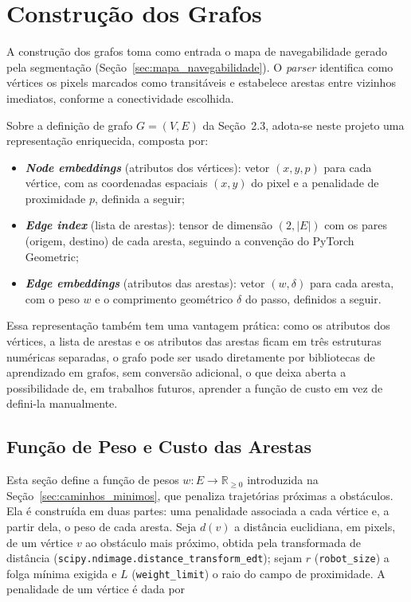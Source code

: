 \documentclass[
    12pt,
    openright,
    oneside,
    a4paper,
    english,
    brazil
]{abntex2}
\begin{document}
\section{Construção dos Grafos}
\label{sec:construcao_grafos}

A construção dos grafos toma como entrada o mapa de navegabilidade gerado pela segmentação (Seção~\ref{sec:mapa_navegabilidade}). O \textit{parser} identifica como vértices os pixels marcados como transitáveis e estabelece arestas entre vizinhos imediatos, conforme a conectividade escolhida.

Sobre a definição de grafo $G = (V, E)$ da Seção~2.3, adota-se neste projeto uma representação enriquecida, composta por:

\begin{itemize}
    \item \textbf{\textit{Node embeddings}} (atributos dos vértices): vetor $(x, y, p)$ para cada vértice, com as coordenadas espaciais $(x, y)$ do pixel e a penalidade de proximidade $p$, definida a seguir;
    \item \textbf{\textit{Edge index}} (lista de arestas): tensor de dimensão $(2, |E|)$ com os pares (origem, destino) de cada aresta, seguindo a convenção do PyTorch Geometric;
    \item \textbf{\textit{Edge embeddings}} (atributos das arestas): vetor $(w, \delta)$ para cada aresta, com o peso $w$ e o comprimento geométrico $\delta$ do passo, definidos a seguir.
\end{itemize}

Essa representação também tem uma vantagem prática: como os atributos dos vértices, a lista de arestas e os atributos das arestas ficam em três estruturas numéricas separadas, o grafo pode ser usado diretamente por bibliotecas de aprendizado em grafos, sem conversão adicional, o que deixa aberta a possibilidade de, em trabalhos futuros, aprender a função de custo em vez de defini-la manualmente.

\subsection{Função de Peso e Custo das Arestas}

Esta seção define a função de pesos $w : E \to \mathbb{R}_{\geq 0}$ introduzida na Seção~\ref{sec:caminhos_minimos}, que penaliza trajetórias próximas a obstáculos. Ela é construída em duas partes: uma penalidade associada a cada vértice e, a partir dela, o peso de cada aresta. Seja $d(v)$ a distância euclidiana, em pixels, de um vértice $v$ ao obstáculo mais próximo, obtida pela transformada de distância (\texttt{scipy.\allowbreak ndimage.\allowbreak distance\_\allowbreak{}\allowbreak transform\_\allowbreak{}\allowbreak edt}); sejam $r$ (\texttt{robot\_\allowbreak{}size}) a folga mínima exigida e $L$ (\texttt{weight\_\allowbreak{}limit}) o raio do campo de proximidade. A penalidade de um vértice é dada por
\end{document}
